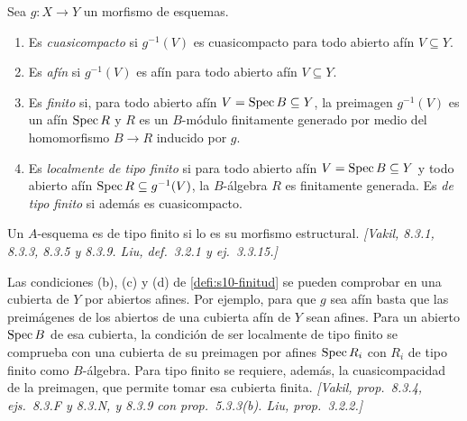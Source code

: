 \begin{defi}
\label{defi:s10-finitud}
Sea \(g\colon X\to Y\) un morfismo de esquemas.
\begin{enumerate}[label=(\alph*)]
\item Es \emph{cuasicompacto} si \(g^{-1}(V)\) es cuasicompacto para todo abierto afín \(V\subseteq Y\).
\item Es \emph{afín} si \(g^{-1}(V)\) es afín para todo abierto afín \(V\subseteq Y\).
\item Es \emph{finito} si, para todo abierto afín \(V=\operatorname{Spec} B\subseteq Y\), la preimagen \(g^{-1}(V)\) es un afín \(\operatorname{Spec} R\) y \(R\) es un \(B\)-módulo finitamente generado por medio del homomorfismo \(B\to R\) inducido por \(g\).
\item Es \emph{localmente de tipo finito} si para todo abierto afín \(V=\operatorname{Spec} B\subseteq Y\) y todo abierto afín \(\operatorname{Spec} R\subseteq g^{-1}(V)\), la \(B\)-álgebra \(R\) es finitamente generada. Es \emph{de tipo finito} si además es cuasicompacto.
\end{enumerate}
Un \(A\)-esquema es de tipo finito si lo es su morfismo estructural. \emph{[Vakil, 8.3.1, 8.3.3, 8.3.5 y 8.3.9. Liu, def.~3.2.1 y ej.~3.3.15.]}
\end{defi}

\begin{obs}
\label{obs:s10-finitud-cubiertas}
Las condiciones (b), (c) y (d) de \cref{defi:s10-finitud} se pueden comprobar en una cubierta de \(Y\) por abiertos afines. Por ejemplo, para que \(g\) sea afín basta que las preimágenes de los abiertos de una cubierta afín de \(Y\) sean afines. Para un abierto \(\operatorname{Spec} B\) de esa cubierta, la condición de ser localmente de tipo finito se comprueba con una cubierta de su preimagen por afines \(\operatorname{Spec} R_i\) con \(R_i\) de tipo finito como \(B\)-álgebra. Para tipo finito se requiere, además, la cuasicompacidad de la preimagen, que permite tomar esa cubierta finita. \emph{[Vakil, prop.~8.3.4, ejs.~8.3.F y 8.3.N, y 8.3.9 con prop.~5.3.3(b). Liu, prop.~3.2.2.]}
\end{obs}


